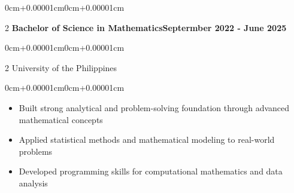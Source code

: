 \documentclass[11pt, letterpaper]{article}
\newenvironment{highlights}{\begin{itemize}[topsep=0.10cm,parsep=0.10cm,partopsep=0pt,itemsep=0pt,leftmargin=0cm+12pt]}{\end{itemize}}
\newenvironment{onecolentry}{\begin{adjustwidth}{0cm+0.00001cm}{0cm+0.00001cm}}{\end{adjustwidth}}
\newenvironment{twocolentry}[2][]{\onecolentry\def\secondColumn{#2}\setcolumnwidth{\fill,5.5cm}\begin{paracol}{2}}{\switchcolumn \raggedleft \secondColumn\end{paracol}\endonecolentry}
\begin{document}
    \begin{twocolentry}{\textbf{Septermber 2022 - June 2025}}
    \textbf{Bachelor of Science in Mathematics}\end{twocolentry}
    \vspace{0.05cm}
    \begin{twocolentry}{}
    University of the Philippines\end{twocolentry}
    \vspace{0.10cm}
    \begin{onecolentry}
        \begin{highlights}
            \item Built strong analytical and problem-solving foundation through advanced mathematical concepts
            \item Applied statistical methods and mathematical modeling to real-world problems
            \item Developed programming skills for computational mathematics and data analysis
        \end{highlights}
    \end{onecolentry}
    \vspace{0.15cm}
\end{document}
